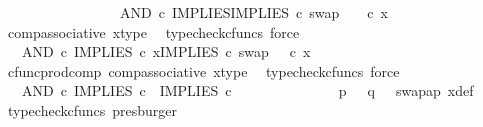 \begin{isabellebody}
\ \ \ \ \ \ \ \ \ \ \ \ \ \ \ \ \ AND\ {\isasymcirc}\isactrlsub c\ {\isasymlangle}IMPLIES{\isacharcomma}{\kern0pt}IMPLIES\ {\isasymcirc}\isactrlsub c\ swap\ {\isasymOmega}\ {\isasymOmega}{\isasymrangle}\ \ {\isasymcirc}\isactrlsub c\ x{\isachardoublequoteclose}\isanewline
\ \ \ \ \ \ \ \ \ \ \ \ \isamarkupfalse%
\ comp{\isacharunderscore}{\kern0pt}associative{}\ x{\isacharunderscore}{\kern0pt}type\ \isamarkupfalse%
\ {\isacharparenleft}{\kern0pt}typecheck{\isacharunderscore}{\kern0pt}cfuncs{\isacharcomma}{\kern0pt}\ force{\isacharparenright}{\kern0pt}\isanewline
\ \ \ \ \ \ \ \ \ \ \isamarkupfalse%
\ \isamarkupfalse%
\ {\isachardoublequoteopen}{\isachardot}{\kern0pt}{\isachardot}{\kern0pt}{\isachardot}{\kern0pt}\ {\isacharequal}{\kern0pt}\ AND\ {\isasymcirc}\isactrlsub c\ {\isasymlangle}IMPLIES\ {\isasymcirc}\isactrlsub c\ x{\isacharcomma}{\kern0pt}IMPLIES\ {\isasymcirc}\isactrlsub c\ swap\ {\isasymOmega}\ {\isasymOmega}\ {\isasymcirc}\isactrlsub c\ x{\isasymrangle}{\isachardoublequoteclose}\isanewline
\ \ \ \ \ \ \ \ \ \ \ \ \isamarkupfalse%
\ cfunc{\isacharunderscore}{\kern0pt}prod{\isacharunderscore}{\kern0pt}comp\ comp{\isacharunderscore}{\kern0pt}associative{}\ x{\isacharunderscore}{\kern0pt}type\ \isamarkupfalse%
\ {\isacharparenleft}{\kern0pt}typecheck{\isacharunderscore}{\kern0pt}cfuncs{\isacharcomma}{\kern0pt}\ force{\isacharparenright}{\kern0pt}\isanewline
\ \ \ \ \ \ \ \ \ \ \isamarkupfalse%
\ \isamarkupfalse%
\ {\isachardoublequoteopen}{\isachardot}{\kern0pt}{\isachardot}{\kern0pt}{\isachardot}{\kern0pt}\ {\isacharequal}{\kern0pt}\ AND\ {\isasymcirc}\isactrlsub c\ {\isasymlangle}IMPLIES\ {\isasymcirc}\isactrlsub c\ {\isasymlangle}{\isasymt}{\isacharcomma}{\kern0pt}{\isasymt}{\isasymrangle}{\isacharcomma}{\kern0pt}\ IMPLIES\ {\isasymcirc}\isactrlsub c\ {\isasymlangle}{\isasymt}{\isacharcomma}{\kern0pt}{\isasymt}{\isasymrangle}{\isasymrangle}{\isachardoublequoteclose}\isanewline
\ \ \ \ \ \ \ \ \ \ \ \ \isamarkupfalse%
\ {\isacartoucheopen}p\ {\isacharequal}{\kern0pt}\ {\isasymt}{\isacartoucheclose}\ {\isacartoucheopen}q\ {\isacharequal}{\kern0pt}\ {\isasymt}{\isacartoucheclose}\ swap{\isacharunderscore}{\kern0pt}ap\ x{\isacharunderscore}{\kern0pt}def\ \isamarkupfalse%
\ {\isacharparenleft}{\kern0pt}typecheck{\isacharunderscore}{\kern0pt}cfuncs{\isacharcomma}{\kern0pt}\ presburger{\isacharparenright}{\kern0pt}\isanewline
\ \ \ \ \ \ \ \ \ \ \isamarkupfalse%

\end{isabellebody}
